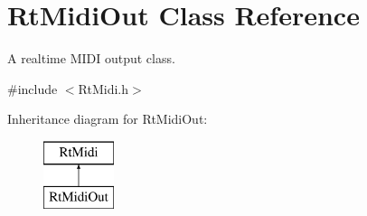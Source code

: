 \hypertarget{class_rt_midi_out}{}\section{Rt\+Midi\+Out Class Reference}
\label{class_rt_midi_out}


A realtime M\+I\+DI output class.  




{\ttfamily \#include $<$Rt\+Midi.\+h$>$}

Inheritance diagram for Rt\+Midi\+Out\+:\begin{figure}[H]
\begin{center}
\leavevmode
\includegraphics[height=2.000000cm]{class_rt_midi_out}
\end{center}
\end{figure}
